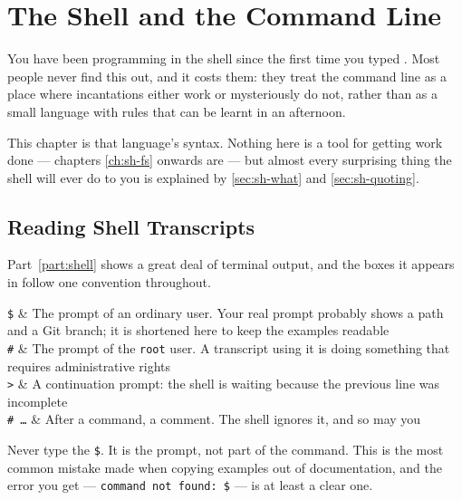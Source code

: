 \chapter{The Shell and the Command Line}\label{ch:sh-cmdline}

You have been programming in the shell since the first time you typed
. Most people never find this out, and it costs them: they treat the
command line as a place where incantations either work or mysteriously do not,
rather than as a small language with rules that can be learnt in an afternoon.

This chapter is that language's syntax. Nothing here is a tool for getting work
done --- chapters \ref{ch:sh-fs} onwards are --- but almost every surprising
thing the shell will ever do to you is explained by \autoref{sec:sh-what} and
\autoref{sec:sh-quoting}.

\section{Reading Shell Transcripts}\label{sec:sh-notation}

Part~\ref{part:shell} shows a great deal of terminal output, and the boxes it
appears in follow one convention throughout.


\begin{keys}[0.20]
	\texttt{\$}   & The prompt of an ordinary user. Your real prompt probably shows a path and a Git branch; it is shortened here to keep the examples readable \\
	\texttt{\#}   & The prompt of the \texttt{root} user. A transcript using it is doing something that requires administrative rights \\
	\texttt{>}    & A continuation prompt: the shell is waiting because the previous line was incomplete \\
	\texttt{\# \dots} & After a command, a comment. The shell ignores it, and so may you \\
\end{keys}

\begin{note}
	Never type the \texttt{\$}. It is the prompt, not part of the command. This is
	the most common mistake made when copying examples out of documentation, and
	the error you get --- \texttt{command not found: \$} --- is at least a clear
	one.
\end{note}

